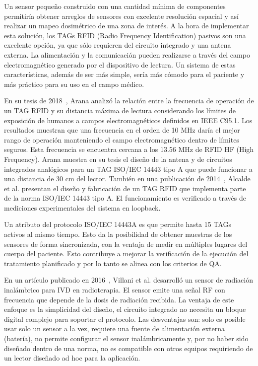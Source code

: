 \documentclass[a4paper, twoside, 11pt]{report}
\begin{document}
Un sensor pequeño construido con una cantidad mínima de componentes permitiría obtener arreglos de sensores con excelente resolución espacial y así realizar un mapeo dosimétrico de una zona de interés. A la hora de implementar esta solución, los TAGs RFID (Radio Frequency Identification) pasivos son una excelente opción, ya que sólo requieren del circuito integrado y una antena externa. La alimentación y la comunicación pueden realizarse a través del campo electromagnético generado por el dispositivo de lectura. Un sistema de estas características, además de ser más simple, sería más cómodo para el paciente y más práctico para su uso en el campo médico.

En su tesis de 2018~\cite{Arana_thesis}, Arana analizó la relación entre la frecuencia de operación de un TAG RFID y su distancia máxima de lectura considerando los límites de exposición de humanos a campos electromagnéticos definidos en IEEE C95.1. Los resultados muestran que una frecuencia en el orden de 10 MHz daría el mejor rango de operación manteniendo el campo electromagnético dentro de límites seguros. Esta frecuencia se encuentra cercana a los 13.56 MHz de RFID HF (High Frequency). Arana muestra en su tesis el diseño de la antena y de circuitos integrados analógicos para un TAG ISO/IEC 14443 tipo A que puede funcionar a una distancia de 30 cm del lector. También en una publicación de 2014~\cite{fabricio_eamta}, Alcalde et al. presentan el diseño y fabricación de un TAG RFID que implementa parte de la norma ISO/IEC 14443 tipo A. El funcionamiento es verificado a través de mediciones experimentales del sistema en loopback.

Un atributo del protocolo ISO/IEC 14443A es que permite hasta 15 TAGs activos al mismo tiempo. Esto da la posibilidad de obtener muestras de los sensores de forma sincronizada, con la ventaja de medir en múltiples lugares del cuerpo del paciente. Esto contribuye a mejorar la verificación de la ejecución del tratamiento planificado y por lo tanto se alinea con los criterios de QA.

En un artículo publicado en 2016~\cite{monolithic_180nm}, Villani et al. desarrolló un sensor de radiación inalámbrico para IVD en radioterapia. El sensor emite una señal RF con frecuencia que depende de la dosis de radiación recibida. La ventaja de este enfoque es la simplicidad del diseño, el circuito integrado no necesita un bloque digital complejo para soportar el protocolo. Las desventajas son: solo es posible usar solo un sensor a la vez, requiere una fuente de alimentación externa (batería), no permite configurar el sensor inalámbricamente y, por no haber sido diseñado dentro de una norma, no es compatible con otros equipos requiriendo de un lector diseñado ad hoc para la aplicación.
\end{document}
